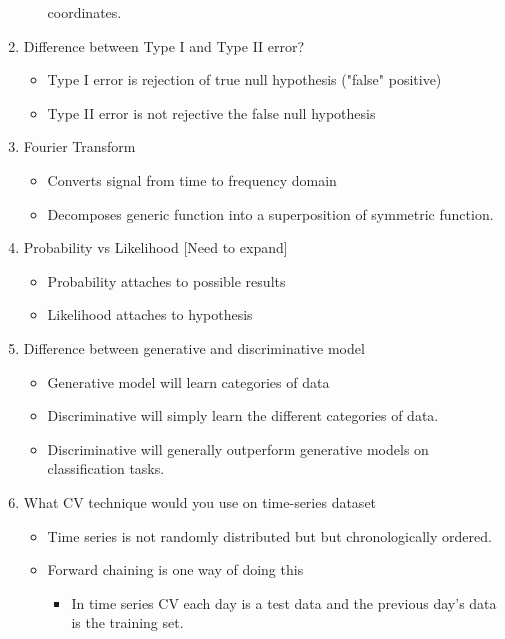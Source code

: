 \documentclass[12pt,a4paper]{article}
\begin{document}
\begin{enumerate}
\begin{itemize}
            coordinates. 
    \end{itemize}
    \item Difference between Type I and Type II error?
    \begin{itemize}
      \item Type I error is rejection of true null hypothesis ("false" positive)
      \item Type II error is not rejective the false null hypothesis 
    \end{itemize}
    \item Fourier Transform
    \begin{itemize}
      \item Converts signal from time to frequency domain
      \item Decomposes generic function into a superposition of symmetric 
            function.
    \end{itemize}
    \item Probability vs Likelihood [Need to expand]
    \begin{itemize}
      \item Probability attaches to possible results
      \item Likelihood attaches to hypothesis
    \end{itemize}
    \item Difference between generative and discriminative model
    \begin{itemize}
      \item Generative model will learn categories of data
      \item Discriminative will simply learn the different categories 
            of data.
      \item Discriminative will generally outperform generative models 
            on classification tasks.
    \end{itemize}
    \item What CV technique would you use on time-series dataset
    \begin{itemize}
      \item Time series is not randomly distributed but 
            but chronologically ordered.
      \item Forward chaining is one way of doing this
      \begin{itemize}
        \item In time series CV each day is a test data and the 
              previous day's data is the training set.  \\

\end{itemize}
\end{itemize}
\end{enumerate}
\end{document}
